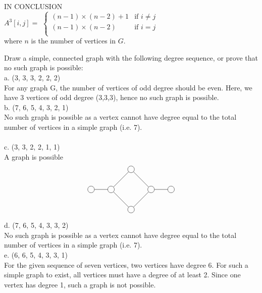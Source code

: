 \documentclass[12pt]{article}
\newenvironment{question}[2][Question]{\begin{trivlist}
\item[\hskip \labelsep {\bfseries #1}\hskip \labelsep {\bfseries #2.}]}{\end{trivlist}}
\begin{document}
\begin{center}
\Large IN CONCLUSION \\

\normalsize
$ A^{3}[i,j] = $ 
    $\begin{cases} (n-1) \times (n-2) + 1  & \mbox{if } i \neq  j  \\  (n-1) \times (n-2)   & \mbox{if } i =j \\   \end{cases}$ \\
    where $n$ is the number of vertices in $G$. \\
\end{center}

\begin{question}{6}
Draw a simple, connected graph with the following degree sequence, or prove that no such graph
is possible: \\
a. (3, 3, 3, 2, 2, 2) \\
For any graph G, the number of vertices of odd degree should be even. Here, we have 3 vertices of odd degree (3,3,3), hence no such graph is possible. \\
b. (7, 6, 5, 4, 3, 2, 1) \\
No such graph is possible as a vertex cannot have degree equal to the total number of vertices in a simple graph (i.e. 7). \\ \\
c. (3, 3, 2, 2, 1, 1) \\
A graph is possible \\
\begin{align*}
\begin{tikzpicture}
\node[shape=circle,draw=black] (A) at (-1,0) {};
\node[shape=circle,draw=black] (B) at (0,1) {};
\node[shape=circle,draw=black] (C) at (1,0) {};
\node[shape=circle,draw=black] (D) at (0,-1) {};
\node[shape=circle,draw=black] (E) at (-2,0) {};
\node[shape=circle,draw=black] (F) at (2,0) {};
\path [] (A) edge node[left] {} (B);
\path [] (B) edge node[left] {} (C);
\path [] (C) edge node[left] {} (D);
\path [] (D) edge node[left] {} (A);
\path [] (A) edge node[left] {} (E);
\path [] (C) edge node[left] {} (F);
\end{tikzpicture}
\end{align*}
d. (7, 6, 5, 4, 3, 3, 2) \\
No such graph is possible as a vertex cannot have degree equal to the total number of vertices in a simple graph (i.e. 7). \\
e. (6, 6, 5, 4, 3, 3, 1)\\
For the given sequence of seven vertices, two vertices have degree 6. For such a simple graph to exist, all vertices must have a degree of at least 2. Since one vertex has degree 1, such a graph is not possible.
\end{question}
\end{document}
